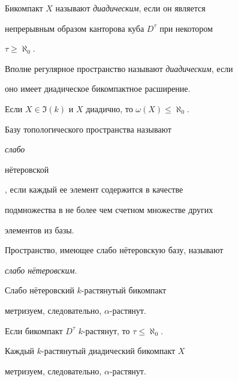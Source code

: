  


Бикомпакт $X$ называют {\it диадическим}, если он является 


непрерывным образом канторова куба $D^\tau$ при некотором 


$\tau\ge\aleph_0$. 


 


Вполне регулярное пространство называют {\it диадическим}, если 


оно имеет диадическое бикомпактное расширение. 


 


\begin{cor} 


Если $X\in\Im(k)$ и $X$ диадично, то $\omega(X)\le\aleph_0$. 


\end{cor} 


 


Базу топологического пространства называют {\it слабо 


н\"етеровской}, если каждый ее элемент содержится в качестве 


подмножества в не более чем счетном множестве других 


элементов из базы.  


 


Пространство, имеющее слабо н\"етеровскую базу, называют 


{\it слабо н\"етеровским}. 


 


\begin{cor} 


Слабо н\"етеровский $k$-растянутый бикомпакт  


метризуем, следовательно, $\alpha$-растянут.  


\end{cor} 


 


\begin{cor} 


Если бикомпакт $D^\tau$\; $k$-растянут, то $\tau\le\aleph_0$. 


\end{cor} 


 


\begin{cor} 


Каждый $k$-растянутый диадический бикомпакт $X$ 


метризуем, следовательно, $\alpha$-растянут. 


\end{cor} 


